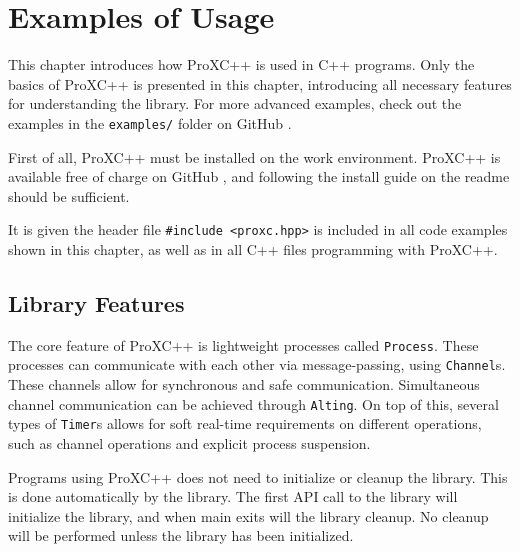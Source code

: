 

\chapter{Examples of Usage}
\label{ch:examples_usage}

This chapter introduces how ProXC++ is used in C++ programs. Only the basics of ProXC++ is presented in this chapter, introducing all necessary features for understanding the library. For more advanced examples, check out the examples in the \texttt{examples/} folder on GitHub \citep{pettersen2017proxcgithub}.

First of all, ProXC++ must be installed on the work environment. ProXC++ is available free of charge on GitHub \citep{pettersen2017proxcgithub}, and following the install guide on the readme should be sufficient.

It is given the header file \lstinline[style={CustomC++}]|#include <proxc.hpp>| is included in all code examples shown in this chapter, as well as in all C++ files programming with ProXC++.


\section{Library Features}
\label{sec:example_library_features}

The core feature of ProXC++ is lightweight processes called \texttt{Process}. These processes can communicate with each other via message\hyp{}passing, using \texttt{Channel}s. These channels allow for synchronous and safe communication. Simultaneous channel communication can be achieved through \texttt{Alting}. On top of this, several types of \texttt{Timer}s allows for soft real\hyp{}time requirements on different operations, such as channel operations and explicit process suspension.

Programs using ProXC++ does not need to initialize or cleanup the library. This is done automatically by the library. The first API call to the library will initialize the library, and when main exits will the library cleanup. No cleanup will be performed unless the library has been initialized. 


